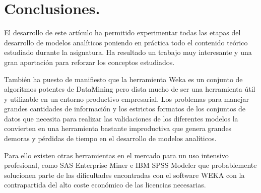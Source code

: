 \section{Conclusiones.}

El desarrollo de este artículo ha permitido experimentar todas las etapas del desarrollo de modelos analíticos poniendo en práctica todo el contenido teórico estudiado durante la asignatura. Ha resultado un trabajo muy interesante y una gran aportación para reforzar los conceptos estudiados. 

También ha puesto de manifiesto que la herramienta Weka es un conjunto de algoritmos potentes de DataMining pero dista mucho de ser una herramienta útil y utilizable en un entorno productivo empresarial. Los problemas para manejar grandes cantidades de información y los estrictos formatos de los conjuntos de datos que necesita para realizar las validaciones de los diferentes modelos la convierten en una herramienta bastante improductiva que genera grandes demoras y pérdidas de tiempo en el desarrollo de modelos analíticos.

Para ello existen otras herramientas en el mercado para un uso intensivo profesional, como SAS Enterprise Miner e IBM SPSS Modeler que probablemente solucionen parte de las dificultades encontradas con el software WEKA con la contrapartida del alto coste económico de las licencias necesarias.